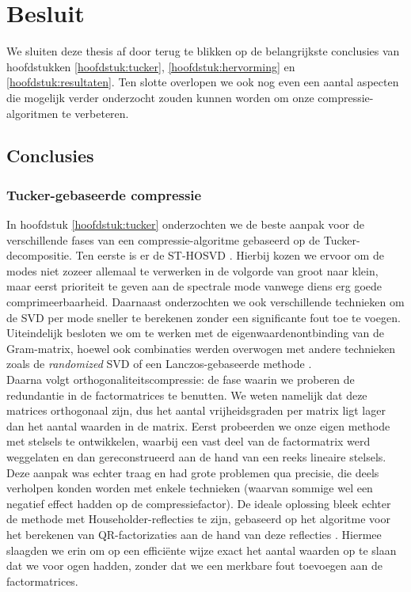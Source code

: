 \chapter{Besluit}
\label{hoofdstuk:besluit}

We sluiten deze thesis af door terug te blikken op de belangrijkste conclusies van hoofdstukken \ref{hoofdstuk:tucker}, \ref{hoofdstuk:hervorming} en \ref{hoofdstuk:resultaten}. Ten slotte overlopen we ook nog even een aantal aspecten die mogelijk verder onderzocht zouden kunnen worden om onze compressie-algoritmen te verbeteren.

\section{Conclusies}

\subsection{Tucker-gebaseerde compressie}

In hoofdstuk \ref{hoofdstuk:tucker} onderzochten we de beste aanpak voor de verschillende fases van een compressie-algoritme gebaseerd op de Tucker-decompositie. Ten eerste is er de ST-HOSVD \cite{ref:st_hosvd}. Hierbij kozen we ervoor om de modes niet zozeer allemaal te verwerken in de volgorde van groot naar klein, maar eerst prioriteit te geven aan de spectrale mode vanwege diens erg goede comprimeerbaarheid. Daarnaast onderzochten we ook verschillende technieken om de SVD per mode sneller te berekenen zonder een significante fout toe te voegen. Uiteindelijk besloten we om te werken met de eigenwaardenontbinding van de Gram-matrix, hoewel ook combinaties werden overwogen met andere technieken zoals de \textit{randomized} SVD \cite{ref:randomized_svd} of een Lanczos-gebaseerde methode \cite{ref:lanczos} \cite{ref:saad}.\\

Daarna volgt orthogonaliteitscompressie: de fase waarin we proberen de redundantie in de factormatrices te benutten. We weten namelijk dat deze matrices orthogonaal zijn, dus het aantal vrijheidsgraden per matrix ligt lager dan het aantal waarden in de matrix. Eerst probeerden we onze eigen methode met stelsels te ontwikkelen, waarbij een vast deel van de factormatrix werd weggelaten en dan gereconstrueerd aan de hand van een reeks lineaire stelsels. Deze aanpak was echter traag en had grote problemen qua precisie, die deels verholpen konden worden met enkele technieken (waarvan sommige wel een negatief effect hadden op de compressiefactor). De ideale oplossing bleek echter de methode met Householder-reflecties te zijn, gebaseerd op het algoritme voor het berekenen van QR-factorizaties aan de hand van deze reflecties \cite{ref:qr_factorization_householder}. Hiermee slaagden we erin om op een effici\"ente wijze exact het aantal waarden op te slaan dat we voor ogen hadden, zonder dat we een merkbare fout toevoegen aan de factormatrices.\\

